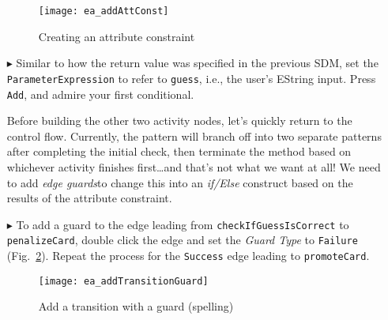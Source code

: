 \begin{itemize}
\vspace{0.5cm}

\begin{figure}[htbp]
\begin{center}
  \texttt{[image: ea\_addAttConst]}
  \caption{Creating an attribute constraint}
  \label{fig:sdmcheck_att_constraint}
\end{center}
\end{figure}

\item[$\blacktriangleright$] Similar to how the return value was specified in the previous SDM, set the \texttt{ParameterExpression} to refer to \texttt{guess},
i.e., the user's EString input. Press \texttt{Add}, and admire your first conditional.

\vspace{0.5cm}

Before building the other two activity nodes, let's quickly return to the control flow. Currently, the pattern will branch off into two separate patterns after
completing the initial check, then terminate the method based on whichever activity finishes first\ldots and that's not what we want at all! We need to add
\emph{edge guards}to change this into an \emph{if/Else} construct based on the results of the attribute constraint.

\newpage

\item[$\blacktriangleright$] To add a guard to the edge leading from \texttt{check\-If\-Guess\-Is\-Correct} to \texttt{penalize\-Card}, double click the edge
and set the \emph{Guard Type} to \texttt{Failure} (Fig.~\ref{fig:sdm_check_guard}). Repeat the process for the \texttt{Success} edge leading to
\texttt{promoteCard}.

\vspace{0.5cm}

\begin{figure}[htbp]
\begin{center}
  \texttt{[image: ea\_addTransitionGuard]}
  \caption{Add a transition with a guard \update(spelling)}
  \label{fig:sdm_check_guard}
\end{center}
\end{figure}

\vspace{0.5cm}


\end{itemize}
